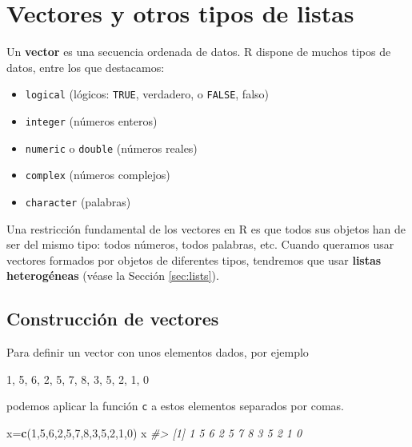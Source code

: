 \documentclass[
]{book}
\newenvironment{Shaded}{\begin{snugshade}}{\end{snugshade}}
\newcommand{\CommentTok}[1]{\textcolor[rgb]{0.56,0.35,0.01}{\textit{#1}}}
\newcommand{\DecValTok}[1]{\textcolor[rgb]{0.00,0.00,0.81}{#1}}
\newcommand{\KeywordTok}[1]{\textcolor[rgb]{0.13,0.29,0.53}{\textbf{#1}}}
\newcommand{\NormalTok}[1]{#1}
\providecommand{\tightlist}{%
  \setlength{\itemsep}{0pt}\setlength{\parskip}{0pt}}
\theoremstyle{definition}
\theoremstyle{definition}
\theoremstyle{definition}
\theoremstyle{remark}
\begin{document}
\hypertarget{chap:vect}{%
\chapter{Vectores y otros tipos de listas}\label{chap:vect}}

Un \textbf{vector} es una secuencia ordenada de datos. R dispone de muchos tipos de datos, entre los que destacamos:

\begin{itemize}
\tightlist
\item
  \texttt{logical} (lógicos: \texttt{TRUE}, verdadero, o \texttt{FALSE}, falso)
\item
  \texttt{integer} (números enteros)
\item
  \texttt{numeric} o \texttt{double} (números reales)
\item
  \texttt{complex} (números complejos)
\item
  \texttt{character} (palabras)
\end{itemize}

Una restricción fundamental de los vectores en R es que todos sus objetos han de ser del mismo tipo: todos números, todos palabras, etc.
Cuando queramos usar vectores formados por objetos de diferentes tipos, tendremos que usar \textbf{listas heterogéneas} (véase la Sección \ref{sec:lists}).

\hypertarget{sec:vect}{%
\section{Construcción de vectores}\label{sec:vect}}

Para definir un vector con unos elementos dados, por ejemplo

1, 5, 6, 2, 5, 7, 8, 3, 5, 2, 1, 0

podemos aplicar la función \texttt{c} a estos elementos separados por comas.

\begin{Shaded}
\begin{Highlighting}[]
\NormalTok{x=}\KeywordTok{c}\NormalTok{(}\DecValTok{1}\NormalTok{,}\DecValTok{5}\NormalTok{,}\DecValTok{6}\NormalTok{,}\DecValTok{2}\NormalTok{,}\DecValTok{5}\NormalTok{,}\DecValTok{7}\NormalTok{,}\DecValTok{8}\NormalTok{,}\DecValTok{3}\NormalTok{,}\DecValTok{5}\NormalTok{,}\DecValTok{2}\NormalTok{,}\DecValTok{1}\NormalTok{,}\DecValTok{0}\NormalTok{)}
\NormalTok{x}
\CommentTok{\#\textgreater{}  [1] 1 5 6 2 5 7 8 3 5 2 1 0}
\end{Highlighting}
\end{Shaded}
\end{document}
